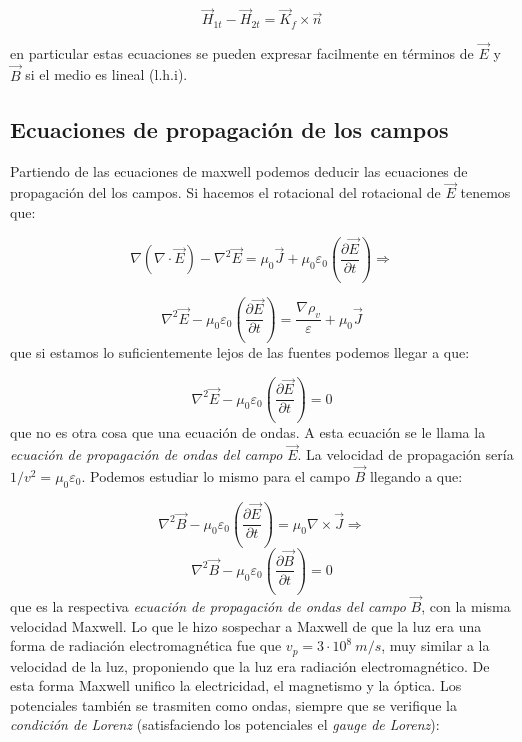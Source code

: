 \documentclass[12pt,a4paper]{article}
\newcommand{\parentesis}[1]{\left( #1  \right)}
\newcommand{\parciales}[2]{\frac{\partial #1}{\partial #2}}
\newcommand{\pparciales}[2]{\parentesis{\parciales{#1}{#2}}}
\begin{document}
\begin{equation}
\vec{H}_{1t} - \vec{H}_{2t} = \vec{K}_f \times \vec{n}
\end{equation}

en particular estas ecuaciones se pueden expresar facilmente en términos de $\vec{E} $ y $\vec{B}$ si el medio es lineal (l.h.i).


\subsection{Ecuaciones de propagación de los campos}

Partiendo de las ecuaciones de maxwell podemos deducir las ecuaciones de propagación del los campos. Si hacemos el rotacional del rotacional de $\vec{E}$ tenemos que:

$$
\nabla (\nabla \cdot \vec{E}) -  \nabla^2 \vec{E} = \mu_0 \vec{J} + \mu_0 \varepsilon_0 \pparciales{\vec{E}}{t} \Longrightarrow
$$

\begin{equation}
\nabla^2 \vec{E} -  \mu_0 \varepsilon_0 \pparciales{\vec{E}}{t}  = \dfrac{\nabla \rho_v}{\varepsilon} + \mu_0 \vec{J}
\end{equation}
que si estamos lo suficientemente lejos de las fuentes podemos llegar a que:

\begin{equation}
\nabla^2 \vec{E} -  \mu_0 \varepsilon_0 \pparciales{\vec{E}}{t}  = 0
\end{equation}
que no es otra cosa que una ecuación de ondas. A esta ecuación se le llama la \textit{ecuación de propagación de ondas del campo} $\vec{E}$. La velocidad de propagación sería $1/v^2 = \mu_0 \varepsilon_0$. Podemos estudiar lo mismo para el campo $\vec{B}$ llegando a que:


\begin{equation}
\nabla^2 \vec{B} -  \mu_0 \varepsilon_0 \pparciales{\vec{E}}{t}  = \mu_0 \nabla \times \vec{J} \Longrightarrow
\end{equation}
\begin{equation}
\nabla^2 \vec{B} -  \mu_0 \varepsilon_0 \pparciales{\vec{B}}{t}  = 0
\end{equation}
que es la respectiva \textit{ecuación de propagación de ondas del campo} $\vec{B}$, con la misma velocidad Maxwell. Lo que le hizo sospechar a Maxwell de que la luz era una forma de radiación electromagnética fue que $v_p = 3 \cdot10^8 \ m/s$, muy similar a la velocidad de la luz, proponiendo que la luz era radiación electromagnético. De esta forma Maxwell unifico la electricidad, el magnetismo y la óptica. Los potenciales también se trasmiten como ondas, siempre que se verifique la \textit{condición de Lorenz} (satisfaciendo los potenciales el \textit{gauge de Lorenz}):
\end{document}
